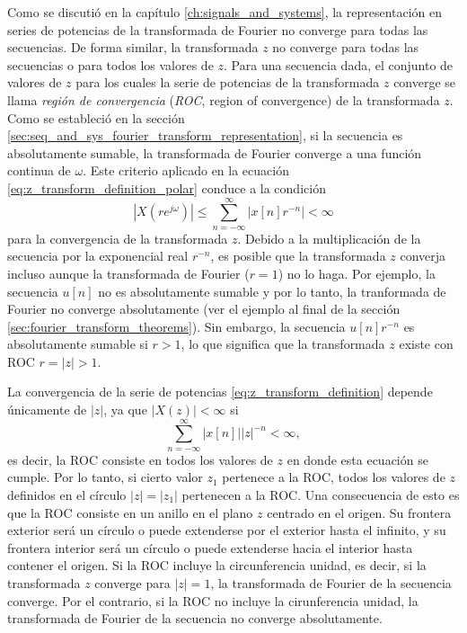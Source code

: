 \documentclass[a4paper]{report}
\begin{document}
Como se discutió en la capítulo \ref{ch:signals_and_systems}, la representación en series de potencias de la transformada de Fourier no converge para todas las secuencias. De forma similar, la transformada \(z\) no converge para todas las secuencias o para todos los valores de \(z\). Para una secuencia dada, el conjunto de valores de \(z\) para los cuales la serie de potencias de la transformada \(z\) converge se llama \emph{región de convergencia} (\emph{ROC}, region of convergence) de la transformada \(z\). Como se estableció en la sección \ref{sec:seq_and_sys_fourier_transform_representation}, si la secuencia es absolutamente sumable, la transformada de Fourier converge a una función continua de \(\omega\). Este criterio aplicado en la ecuación \ref{eq:z_transform_definition_polar} conduce a la condición
\[
 |X(re^{j\omega})|\leq\sum_{n=-\infty}^\infty|x[n]r^{-n}|<\infty 
\]
para la convergencia de la transformada \(z\). Debido a la multiplicación de la secuencia por la exponencial real \(r^{-n}\), es posible que la transformada \(z\) converja incluso aunque la transformada de Fourier (\(r=1\)) no lo haga. Por ejemplo, la secuencia \(u[n]\) no es absolutamente sumable y por lo tanto, la tranformada de Fourier no converge absolutamente (ver el ejemplo al final de la sección \ref{sec:fourier_transform_theorems}). Sin embargo, la secuencia \(u[n]r^{-n}\) es absolutamente sumable si \(r>1\), lo que significa que la transformada \(z\) existe con ROC \(r=|z|>1\).

La convergencia de la serie de potencias \ref{eq:z_transform_definition} depende únicamente de \(|z|\), ya que \(|X(z)|<\infty\) si
\[
 \sum_{n=-\infty}^\infty|x[n]||z|^{-n}<\infty,
\]
es decir, la ROC consiste en todos los valores de \(z\) en donde esta ecuación se cumple. Por lo tanto, si cierto valor \(z_1\) pertenece a la ROC, todos los valores de \(z\) definidos en el círculo \(|z|=|z_1|\) pertenecen a la ROC. Una consecuencia de esto es que la ROC consiste en un anillo en el plano \(z\) centrado en el origen. Su frontera exterior será un círculo o puede extenderse por el exterior hasta el infinito, y su frontera interior será un círculo o puede extenderse hacia el interior hasta contener el origen. Si la ROC incluye la circunferencia unidad, es decir, si la transformada \(z\) converge para \(|z|=1\), la transformada de Fourier de la secuencia converge. Por el contrario, si la ROC no incluye la cirunferencia unidad, la transformada de Fourier de la secuencia no converge absolutamente.
\end{document}
